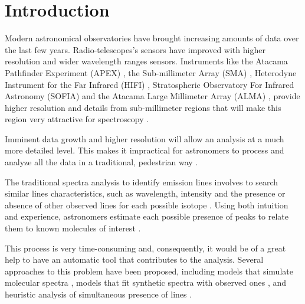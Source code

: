 \section{Introduction} \label{sec:intro}

Modern astronomical observatories have brought increasing amounts of data over the last few years.
Radio-telescopes's sensors have improved with higher resolution and wider wavelength ranges sensors.
Instruments like the Atacama Pathfinder Experiment (APEX) \citep{gusten_apex},
the Sub-millimeter Array (SMA) \citep{ho_submillimeter_2004},
Heterodyne Instrument for the Far Infrared (HIFI) \citep{de_graauw_herschel},
Stratospheric Observatory For Infrared Astronomy (SOFIA) \citep{becklin_stratospheric_2005}
and the Atacama Large Millimeter Array (ALMA) \cite{},
provide higher resolution and details from sub-millimeter regions that will make this region very attractive for spectroscopy
\citep{schilke_line_2001, muller_cologne_2005, schilke_analysis_2011}.

Imminent data growth and higher resolution will allow an analysis at a much more detailed level.
This makes it impractical for astronomers to process and analyze all the data in a traditional, pedestrian way \citep{schilke_analysis_2011, skoda_spectroscopic_2014}.

The traditional spectra analysis to identify emission lines involves to search similar lines characteristics, such as wavelength, intensity and the presence or absence of other observed lines for each possible isotope \citep{sharpee_introducing_2003}.
Using both intuition and experience, astronomers estimate each possible presence of peaks to relate them to known molecules of interest \citep{schilke_analysis_2011}.

This process is very time-consuming and, consequently, it would be of a great help to have an automatic tool that contributes to the analysis.
Several approaches to this problem have been proposed, including models that simulate molecular spectra \citep{schilke_line_2001, comito_molecular_2005, maret_weeds:_2010, caux_cassis_2011, vastel_cassis_2015},  models that fit synthetic spectra with observed ones \citep{pequignot_deep_1996, walsh_deep_2003}, and heuristic analysis of simultaneous presence of lines \citep{sharpee_introducing_2003}.

